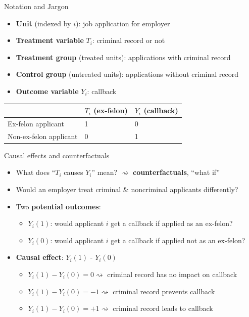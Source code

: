 \documentclass[
  ignorenonframetext,
]{beamer}
\providecommand{\tightlist}{%
  \setlength{\itemsep}{0pt}\setlength{\parskip}{0pt}}
\begin{document}
\begin{frame}{Notation and Jargon}
\label{notation-and-jargon}
\begin{itemize}
\tightlist
\item
  \textbf{Unit} (indexed by \(i\)): job application for employer \pause 
\item
  \textbf{Treatment variable} \(T_i\): criminal record or not \pause 
\item
  \textbf{Treatment group} (treated units): applications with criminal
  record \pause
\item
  \textbf{Control group} (untreated units): applications without
  criminal record \pause
\item
  \textbf{Outcome variable} \(Y_i\): callback
\end{itemize}

\begin{center}  
\begin{tabular}{ l | l  l }
     & $T_i$ (ex-felon)  & $Y_i$ (callback) \\ \hline
    Ex-felon applicant & 1 & 0 \\ 
    Non-ex-felon applicant & 0  & 1 \\ 
\end{tabular}
\end{center}
\end{frame}

\begin{frame}{Causal effects and counterfactuals}
\label{causal-effects-and-counterfactuals}
\begin{itemize}
\tightlist
\item
  What does ``\(T_i\) causes \(Y_i\)'' mean? \(\rightsquigarrow\)
  \textbf{counterfactuals}, ``what if'' \pause
\item
  Would an employer treat criminal \& noncriminal applicants
  differently? \pause
\item
  Two \textbf{potential outcomes}: \pause

  \begin{itemize}
  \tightlist
  \item
    \(Y_i (1)\): would applicant \(i\) get a callback if applied as an
    ex-felon? \pause
  \item
    \(Y_i (0)\): would applicant \(i\) get a callback if applied not as
    an ex-felon? \pause
  \end{itemize}
\item
  \textbf{Causal effect}: \(Y_i (1)\) - \(Y_i (0)\) \pause

  \begin{itemize}
  \tightlist
  \item
    \(Y_i (1) - Y_i (0) = 0 \rightsquigarrow\) criminal record has no
    impact on callback \pause
  \item
    \(Y_i (1) - Y_i (0) = -1 \rightsquigarrow\) criminal record prevents
    callback \pause
  \item
    \(Y_i (1) - Y_i (0) = +1 \rightsquigarrow\) criminal record leads to
    callback
  \end{itemize}
\end{itemize}
\end{frame}
\end{document}
